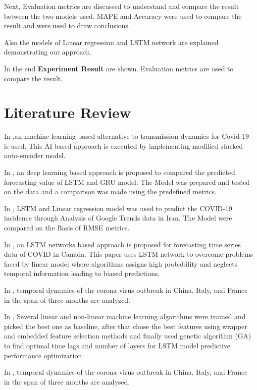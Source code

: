Next, Evaluation metrics are discussed to understand and compare the result
between the two models used. MAPE and Accuracy were used to compare the result
and were used to draw conclusions.

Also the models of Linear regression and LSTM network are explained
demonstrating our approach.

In the end \textbf{Experiment Result} are shown. Evaluation metrics are used
to compare the result.


\section{Literature Review}

In \cite{hu2020artificial},an machine learning based alternative to
transmission dynamics for Covid-19 is used. This AI based approach is executed by implementing modified stacked
auto-encoder model.

In \cite{bandyopadhyay2020machine}, an deep learning based approach is
proposed to compared the predicted forecasting value of LSTM and GRU model. The
Model was prepared and tested on the data and a comparison was made using the
predefined metrics.

In \cite{ayyoubzadeh2020predicting}, LSTM and Linear regression model was used
to predict the COVID-19 incidence through Analysis of Google Trends data in
Iran. The Model were compared on the Basis of RMSE metrics.

In \cite{chimmula2020time}, an LSTM networks based approach is proposed for
forecasting time series data of COVID in Canada.
This paper uses LSTM network to overcome problems faced by linear model where
algorithms assigns high probability and neglects temporal information leading to
biased predictions.

In \cite{fanelli2020analysis}, temporal dynamics of the corona virus outbreak
in China, Italy, and France in the span of three months are analyzed.

In \cite{bouktif2018optimal}, Several linear and non-linear machine learning algorithms were trained and
picked the best one as baseline, after that chose the best features using wrapper and
embedded feature selection methods and finally used genetic algorithm (GA) to find
optimal time lags and number of layers for LSTM model predictive performance
optimization.

In \cite{yang2020modified}, temporal dynamics of the corona virus outbreak in China, Italy, and France in
the span of three months are analysed.

